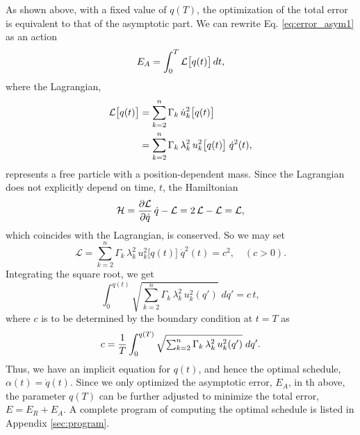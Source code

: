 \documentclass[reprint, floatfix]{revtex4-1}
\newcommand{\Err}{E}
\begin{document}
As shown above, with a fixed value of $q(T)$,
the optimization of the total error is equivalent to
that of the asymptotic part.
%
We can rewrite Eq. \eqref{eq:error_asym1} as an action
%
\begin{equation}
  \Err_A
  =
  \int_0^T
    {\mathcal L} \bigl[ q(t)\bigr]
    \, dt,
  \notag
\end{equation}
%
where the Lagrangian,
%
\begin{align}
  {\mathcal L} \bigl[ q(t) \bigr]
  &=
  \sum_{ k = 2 }^n
    \Gamma_k \, \dot u_k^2\bigl[ q(t) \bigr]
  \notag
  \\
  &=
  \sum_{ k = 2 }^n
    \Gamma_k \, \lambda_k^2 \, u_k^2 \bigl[ q(t) \bigr]
  \; \dot q^2( t ),
\notag
\end{align}
%
represents a free particle
with a position-dependent mass.
%
Since the Lagrangian
does not explicitly depend on time, $t$,
the Hamiltonian
%
\begin{equation}
  \mathcal H
  =
  \frac{ \partial \mathcal L }
       { \partial \dot q     }
  \, \dot q
  -
  \mathcal L
  =
  2 \, \mathcal L
  - \mathcal L
  =
  \mathcal L,
  \notag
\end{equation}
%
which coincides with the Lagrangian,
is conserved.
%
So we may set
%
\begin{equation}
  \mathcal L
  =
    \textstyle\sum_{ k = 2 }^n
      \Gamma_k \, \lambda_k^2
      \, u_k^2 \bigl[ q(t) \bigr]
  \;
  \dot q^2(t)
  =
  c^2
  ,
  \quad
  (c > 0).
  \label{eq:Lagrangian_const}
\end{equation}
%
Integrating the square root, we get
%
\begin{equation}
  \int_{ 0 }^{ q(t) }
    \sqrt{
      \textstyle\sum_{ k = 2 }^n
        \Gamma_k \, \lambda_k^2
        \, u_k^2( q' )
    }
    \;
    d q'
  =
  c \, t
  ,
  \label{eq:q_opt}
\end{equation}
%
where $c$ is to be determined by
the boundary condition at $t = T$ as
%
\begin{equation}
  c =
  \frac 1 T
  \int_{ 0 }^{ q(T) }
    \sqrt{
      \textstyle\sum_{ k = 2 }^n
        \Gamma_k \, \lambda_k^2
        \, u_k^2( q' )
    }
    \;
    d q'
  .
  \notag
\end{equation}
%
Thus, we have an implicit equation for $q(t)$,
and hence the optimal schedule,
$\alpha(t) = \dot q(t)$.
%
Since we only optimized the asymptotic error, $E_A$,
in th above,
the parameter $q(T)$ can be further adjusted
to minimize the total error, $E = E_R + E_A$.
%
A complete program of computing the optimal schedule
is listed in Appendix \ref{sec:program}.
\end{document}
